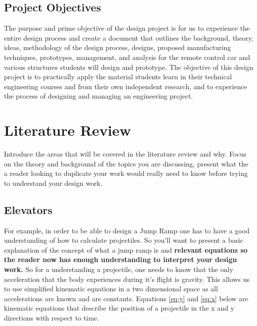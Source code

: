 \documentclass[fleqn,12pt]{project}
\begin{document}
\subsection{Project Objectives}
The purpose and prime objective of the design project is for us to experience the entire design process and create a document that outlines the background, theory, ideas, methodology of the design process,
designs, proposed manufacturing techniques, prototypes, management, and analysis for the remote control car and various structures
students will design and prototype. The objective of this design project is to practically apply the material students learn in their
technical engineering courses and from their own independent research, and to experience the process of designing and managing an engineering project.

\newpage
\section{Literature Review}

Introduce the areas that will be covered in the literature review and why. Focus on the theory and background of the topics you are discussing, present what the a reader looking to duplicate your work would really need to know before trying to understand your design work.

\subsection{Elevators}
For example, in order to be able to design a Jump Ramp one has to have a good understanding of how to calculate projectiles. So you'll want to present a basic explanation of the concept of what a jump ramp is and \textbf{relevant equations so the reader now has enough understanding to interpret your design work.} 
So for a understanding a projectile, one needs to know that the only acceleration that the body experiences during it's flight is gravity. This allows us to use simplified kinematic equations in a two dimensional space as all accelerations are known and are constants. Equations \ref{eq:y} and \ref{eq:x} below are  kinematic equations that describe the position of a projectile in the x and y directions with respect to time.
\end{document}
